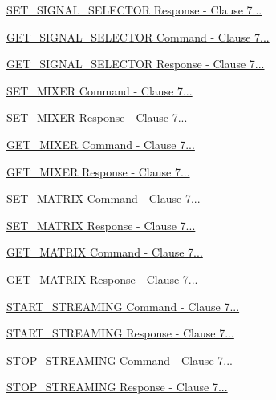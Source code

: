 \begin{DoxyCompactItemize}
\item 
\hyperlink{group__command__set__signal__selector__response}{S\+E\+T\+\_\+\+S\+I\+G\+N\+A\+L\+\_\+\+S\+E\+L\+E\+C\+T\+O\+R Response -\/ Clause 7...}
\item 
\hyperlink{group__command__get__signal__selector}{G\+E\+T\+\_\+\+S\+I\+G\+N\+A\+L\+\_\+\+S\+E\+L\+E\+C\+T\+O\+R Command -\/ Clause 7...}
\item 
\hyperlink{group__command__get__signal__selector__response}{G\+E\+T\+\_\+\+S\+I\+G\+N\+A\+L\+\_\+\+S\+E\+L\+E\+C\+T\+O\+R Response -\/ Clause 7...}
\item 
\hyperlink{group__command__set__mixer}{S\+E\+T\+\_\+\+M\+I\+X\+E\+R Command -\/ Clause 7...}
\item 
\hyperlink{group__command__set__mixer__response}{S\+E\+T\+\_\+\+M\+I\+X\+E\+R Response -\/ Clause 7...}
\item 
\hyperlink{group__command__get__mixer}{G\+E\+T\+\_\+\+M\+I\+X\+E\+R Command -\/ Clause 7...}
\item 
\hyperlink{group__command__get__mixer__response}{G\+E\+T\+\_\+\+M\+I\+X\+E\+R Response -\/ Clause 7...}
\item 
\hyperlink{group__command__set__matrix}{S\+E\+T\+\_\+\+M\+A\+T\+R\+I\+X Command -\/ Clause 7...}
\item 
\hyperlink{group__command__set__matrix__response}{S\+E\+T\+\_\+\+M\+A\+T\+R\+I\+X Response -\/ Clause 7...}
\item 
\hyperlink{group__command__get__matrix}{G\+E\+T\+\_\+\+M\+A\+T\+R\+I\+X Command -\/ Clause 7...}
\item 
\hyperlink{group__command__get__matrix__response}{G\+E\+T\+\_\+\+M\+A\+T\+R\+I\+X Response -\/ Clause 7...}
\item 
\hyperlink{group__command__start__streaming}{S\+T\+A\+R\+T\+\_\+\+S\+T\+R\+E\+A\+M\+I\+N\+G Command -\/ Clause 7...}
\item 
\hyperlink{group__command__start__streaming__response}{S\+T\+A\+R\+T\+\_\+\+S\+T\+R\+E\+A\+M\+I\+N\+G Response -\/ Clause 7...}
\item 
\hyperlink{group__command__stop__streaming}{S\+T\+O\+P\+\_\+\+S\+T\+R\+E\+A\+M\+I\+N\+G Command -\/ Clause 7...}
\item 
\hyperlink{group__command__stop__streaming__response}{S\+T\+O\+P\+\_\+\+S\+T\+R\+E\+A\+M\+I\+N\+G Response -\/ Clause 7...}
\item 

\end{DoxyCompactItemize}
